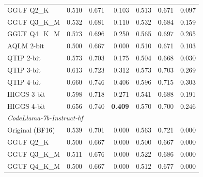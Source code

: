 \begin{table}[htbp]
{\begin{tabular}{l rrr rrr}
    GGUF Q2\_K & 0.510 & 0.671 & 0.103 & 0.513 & 0.671 & 0.097 \\
    GGUF Q3\_K\_M & 0.532 & 0.681 & 0.110 & 0.532 & 0.684 & 0.159 \\
    GGUF Q4\_K\_M & 0.573 & 0.696 & 0.250 & 0.565 & 0.697 & 0.265 \\
    AQLM 2-bit & 0.500 & 0.667 & 0.000 & 0.510 & 0.671 & 0.103 \\
    QTIP 2-bit & 0.573 & 0.703 & 0.175 & 0.504 & 0.668 & 0.030 \\
    QTIP 3-bit & 0.613 & 0.723 & 0.312 & 0.573 & 0.703 & 0.269 \\
    QTIP 4-bit & 0.660 & 0.746 & 0.406 & 0.596 & 0.715 & 0.303 \\
    HIGGS 3-bit & 0.598 & 0.718 & 0.271 & 0.541 & 0.688 & 0.191 \\
    HIGGS 4-bit & 0.656 & 0.740 & \textbf{0.409} & 0.570 & 0.700 & 0.246 \\
    \midrule
    \multicolumn{7}{l}{\textit{CodeLlama-7b-Instruct-hf}} \\
    \midrule
    Original (BF16) & 0.539 & 0.701 & 0.000 & 0.563 & 0.721 & 0.000 \\
    GGUF Q2\_K & 0.500 & 0.667 & 0.000 & 0.500 & 0.667 & 0.000 \\
    GGUF Q3\_K\_M & 0.511 & 0.676 & 0.000 & 0.522 & 0.686 & 0.000 \\
    GGUF Q4\_K\_M & 0.500 & 0.667 & 0.000 & 0.512 & 0.677 & 0.000 \\
    \bottomrule
  \end{tabular}
  }
\end{table}
